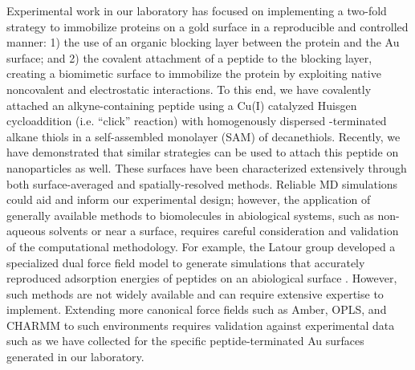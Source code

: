 Experimental work in our laboratory has focused on implementing a two-fold strategy to immobilize proteins on a gold surface in a reproducible and controlled manner: 
1) the use of an organic blocking layer between the protein and the Au surface; and 
2) the covalent attachment of a peptide to the blocking layer, creating a biomimetic surface to immobilize the protein by exploiting native noncovalent and electrostatic interactions. 
To this end, we have covalently attached an alkyne-containing peptide using a Cu(I) catalyzed Huisgen cycloaddition (i.e. ``click'' reaction) with homogenously dispersed -terminated alkane thiols in a self-assembled monolayer (SAM) of decanethiols\cite{Gallardo2010}.   
Recently, we have demonstrated that similar strategies can be used to attach this peptide on nanoparticles as well\cite{Wilder2019}. 
These surfaces have been characterized extensively through both surface-averaged and spatially-resolved methods\cite{Gallardo2010, Gallardo2012, Raigoza2012, Dugger2015a, Dugger2015, Raigoza2017}.
Reliable MD simulations could aid and inform our experimental design; however, the application of generally available methods to biomolecules in abiological systems, such as non-aqueous solvents or near a surface, requires careful consideration and validation of the computational methodology. 
For example, the Latour group developed a specialized dual force field model to generate simulations that accurately reproduced adsorption energies of peptides on an abiological surface \cite{Latour2002, Raut2005, Abramyan2015}.
However, such methods are not widely available and can require extensive expertise to implement. 
Extending more canonical force fields such as Amber, OPLS, and CHARMM to such environments requires validation against experimental data such as we have collected for the specific peptide-terminated Au surfaces generated in our laboratory.

